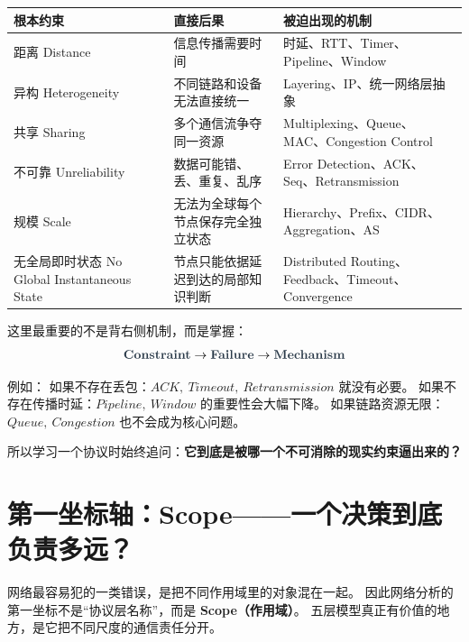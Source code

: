\documentclass[11pt,a4paper,openany]{ctexbook}
\newcommand{\key}[1]{\textbf{\color{deep}#1}}
\begin{document}
\begin{longtable}{p{3.5cm}p{3.5cm}p{\dimexpr\linewidth-7.87cm\relax}}
\toprule
\textbf{根本约束} & \textbf{直接后果} & \textbf{被迫出现的机制}\\
\midrule
距离 Distance & 信息传播需要时间 & 时延、RTT、Timer、Pipeline、Window \\
异构 Heterogeneity & 不同链路和设备无法直接统一 & Layering、IP、统一网络层抽象 \\
共享 Sharing & 多个通信流争夺同一资源 & Multiplexing、Queue、MAC、Congestion Control \\
不可靠 Unreliability & 数据可能错、丢、重复、乱序 & Error Detection、ACK、Seq、Retransmission \\
规模 Scale & 无法为全球每个节点保存完全独立状态 & Hierarchy、Prefix、CIDR、Aggregation、AS \\
无全局即时状态 No Global Instantaneous State & 节点只能依据延迟到达的局部知识判断 & Distributed Routing、Feedback、Timeout、Convergence \\
\bottomrule
\end{longtable}

这里最重要的不是背右侧机制，而是掌握：
\[
\key{Constraint} \rightarrow \key{Failure} \rightarrow \key{Mechanism}
\]

例如：
如果不存在丢包：$ACK,\ Timeout,\ Retransmission$ 就没有必要。
如果不存在传播时延：$Pipeline,\ Window$ 的重要性会大幅下降。
如果链路资源无限：$Queue,\ Congestion$ 也不会成为核心问题。

所以学习一个协议时始终追问：\key{它到底是被哪一个不可消除的现实约束逼出来的？}

\section{第一坐标轴：Scope——一个决策到底负责多远？}
网络最容易犯的一类错误，是把不同作用域里的对象混在一起。
因此网络分析的第一坐标不是“协议层名称”，而是 \key{Scope（作用域）}。
五层模型真正有价值的地方，是它把不同尺度的通信责任分开。
\end{document}
